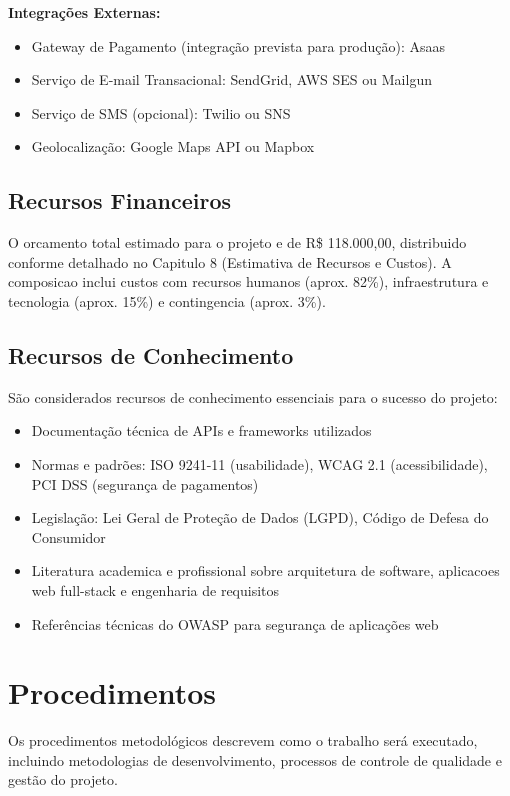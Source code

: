 \textbf{Integrações Externas:}
\begin{itemize}
    \item Gateway de Pagamento (integração prevista para produção): Asaas
    \item Serviço de E-mail Transacional: SendGrid, AWS SES ou Mailgun
    \item Serviço de SMS (opcional): Twilio ou SNS
    \item Geolocalização: Google Maps API ou Mapbox
\end{itemize}

\subsection{Recursos Financeiros}

O orcamento total estimado para o projeto e de R\$ 118.000,00, distribuido conforme detalhado no Capitulo 8 (Estimativa de Recursos e Custos). A composicao inclui custos com recursos humanos (aprox. 82\%), infraestrutura e tecnologia (aprox. 15\%) e contingencia (aprox. 3\%).

\subsection{Recursos de Conhecimento}

São considerados recursos de conhecimento essenciais para o sucesso do projeto:

\begin{itemize}
    \item Documentação técnica de APIs e frameworks utilizados
    \item Normas e padrões: ISO 9241-11 (usabilidade), WCAG 2.1 (acessibilidade), PCI DSS (segurança de pagamentos)
    \item Legislação: Lei Geral de Proteção de Dados (LGPD), Código de Defesa do Consumidor
    \item Literatura academica e profissional sobre arquitetura de software, aplicacoes web full-stack e engenharia de requisitos
    \item Referências técnicas do OWASP para segurança de aplicações web
\end{itemize}

\section{Procedimentos}

Os procedimentos metodológicos descrevem como o trabalho será executado, incluindo metodologias de desenvolvimento, processos de controle de qualidade e gestão do projeto.

